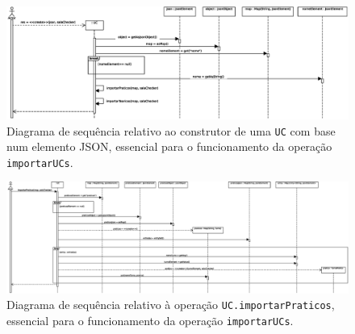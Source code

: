 \documentclass[12pt, a4paper]{article}
\begin{document}
\begin{landscape}
        \vspace*{\fill}
        \pagebreak
        \vspace*{\fill}

        \begin{figure}[H]
            \centering
            \includegraphics[scale=0.8]{Imagens/Modelos/importarUCsConstrutorUCDAO.svg.eps}
            \caption{
                Diagrama de sequência relativo ao construtor de uma \texttt{UC} com base num
                elemento JSON, essencial para o funcionamento da operação \texttt{importarUCs}.
            }
        \end{figure}

        \vspace*{\fill}
        \pagebreak
        \vspace*{\fill}

        \begin{figure}[H]
            \centering
            \includegraphics[scale=0.50]{Imagens/Modelos/importarUCsConstrutorUCimportarPraticosDAO.svg.eps}
            \caption{
                Diagrama de sequência relativo à operação \texttt{UC.importarPraticos}, essencial para o
                funcionamento da operação \texttt{importarUCs}.
            }
        \end{figure}

        \vspace*{\fill}
        \pagebreak
        \vspace*{\fill}


\end{landscape}
\end{document}

